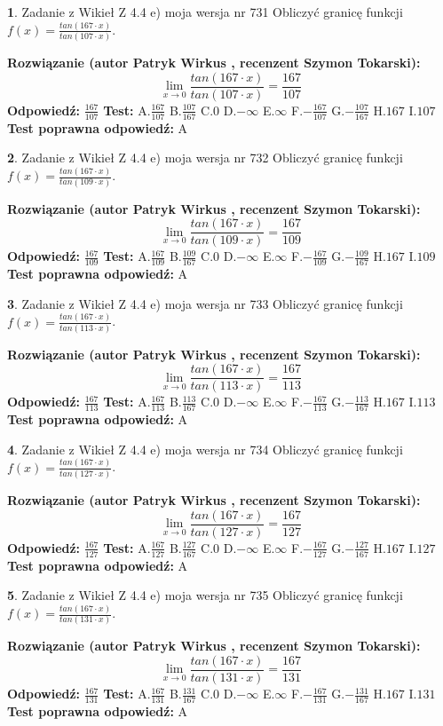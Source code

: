 \documentclass[12pt, a4paper]{article}
\theoremstyle{definition} %
\newtheorem{zad}{}
\newcommand{\zadStart}[1]{\begin{zad}#1\newline}
\newcommand{\zadStop}{\end{zad}}
\newcommand{\rozwStart}[2]{\noindent \textbf{Rozwiązanie (autor #1 , recenzent #2): }\newline}
\newcommand{\rozwStop}{\newline}
\newcommand{\odpStart}{\noindent \textbf{Odpowiedź:}\newline}
\newcommand{\odpStop}{\newline}
\newcommand{\testStart}{\noindent \textbf{Test:}\newline}
\newcommand{\testStop}{\newline}
\newcommand{\kluczStart}{\noindent \textbf{Test poprawna odpowiedź:}\newline}
\newcommand{\kluczStop}{\newline}
\begin{document}
\zadStart{Zadanie z Wikieł Z 4.4 e) moja wersja nr 731}
Obliczyć granicę funkcji $f(x)=\frac{tan(167\cdot x)}{tan(107\cdot x)}$.
\zadStop
\rozwStart{Patryk Wirkus}{Szymon Tokarski}
$$\lim\limits_{x\to 0}\frac{tan(167\cdot x)}{tan(107\cdot x)}=
\frac{167}{107}$$
\rozwStop
\odpStart
$\frac{167}{107}$
\odpStop
\testStart
A.$\frac{167}{107}$
B.$\frac{107}{167}$
C.$0$
D.$-\infty$
E.$\infty$
F.$-\frac{167}{107}$
G.$-\frac{107}{167}$
H.$167$
I.$107$
\testStop
\kluczStart
A
\kluczStop



\zadStart{Zadanie z Wikieł Z 4.4 e) moja wersja nr 732}
Obliczyć granicę funkcji $f(x)=\frac{tan(167\cdot x)}{tan(109\cdot x)}$.
\zadStop
\rozwStart{Patryk Wirkus}{Szymon Tokarski}
$$\lim\limits_{x\to 0}\frac{tan(167\cdot x)}{tan(109\cdot x)}=
\frac{167}{109}$$
\rozwStop
\odpStart
$\frac{167}{109}$
\odpStop
\testStart
A.$\frac{167}{109}$
B.$\frac{109}{167}$
C.$0$
D.$-\infty$
E.$\infty$
F.$-\frac{167}{109}$
G.$-\frac{109}{167}$
H.$167$
I.$109$
\testStop
\kluczStart
A
\kluczStop



\zadStart{Zadanie z Wikieł Z 4.4 e) moja wersja nr 733}
Obliczyć granicę funkcji $f(x)=\frac{tan(167\cdot x)}{tan(113\cdot x)}$.
\zadStop
\rozwStart{Patryk Wirkus}{Szymon Tokarski}
$$\lim\limits_{x\to 0}\frac{tan(167\cdot x)}{tan(113\cdot x)}=
\frac{167}{113}$$
\rozwStop
\odpStart
$\frac{167}{113}$
\odpStop
\testStart
A.$\frac{167}{113}$
B.$\frac{113}{167}$
C.$0$
D.$-\infty$
E.$\infty$
F.$-\frac{167}{113}$
G.$-\frac{113}{167}$
H.$167$
I.$113$
\testStop
\kluczStart
A
\kluczStop



\zadStart{Zadanie z Wikieł Z 4.4 e) moja wersja nr 734}
Obliczyć granicę funkcji $f(x)=\frac{tan(167\cdot x)}{tan(127\cdot x)}$.
\zadStop
\rozwStart{Patryk Wirkus}{Szymon Tokarski}
$$\lim\limits_{x\to 0}\frac{tan(167\cdot x)}{tan(127\cdot x)}=
\frac{167}{127}$$
\rozwStop
\odpStart
$\frac{167}{127}$
\odpStop
\testStart
A.$\frac{167}{127}$
B.$\frac{127}{167}$
C.$0$
D.$-\infty$
E.$\infty$
F.$-\frac{167}{127}$
G.$-\frac{127}{167}$
H.$167$
I.$127$
\testStop
\kluczStart
A
\kluczStop



\zadStart{Zadanie z Wikieł Z 4.4 e) moja wersja nr 735}
Obliczyć granicę funkcji $f(x)=\frac{tan(167\cdot x)}{tan(131\cdot x)}$.
\zadStop
\rozwStart{Patryk Wirkus}{Szymon Tokarski}
$$\lim\limits_{x\to 0}\frac{tan(167\cdot x)}{tan(131\cdot x)}=
\frac{167}{131}$$
\rozwStop
\odpStart
$\frac{167}{131}$
\odpStop
\testStart
A.$\frac{167}{131}$
B.$\frac{131}{167}$
C.$0$
D.$-\infty$
E.$\infty$
F.$-\frac{167}{131}$
G.$-\frac{131}{167}$
H.$167$
I.$131$
\testStop
\kluczStart
A
\kluczStop
\end{document}
